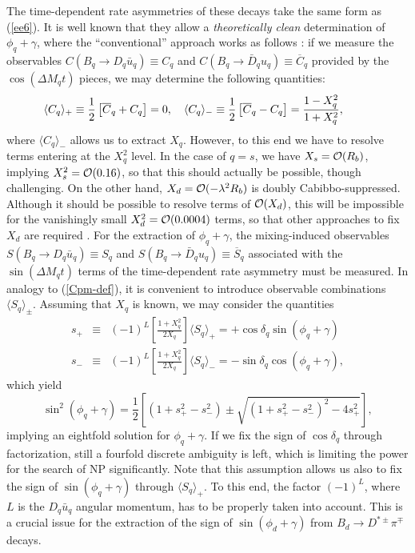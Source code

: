 \documentclass[11pt]{cernrep}
\begin{document}
The time-dependent rate asymmetries of these decays take the same form
as (\ref{ee6}).  It is well known that they allow a {\it theoretically 
clean} determination of $\phi_q+\gamma$, where the ``conventional'' 
approach works as follows \cite{BsDsK,BdDpi}: 
if we measure the observables 
$C(B_q\to D_q\bar u_q)\equiv C_q$ 
and $C(B_q\to \bar D_q u_q)\equiv \overline{C}_q$ provided by the
$\cos(\Delta M_qt)$ pieces, we may determine the following quantities:
\begin{equation}\label{Cpm-def}
\hspace*{-0.9truecm}
\langle C_q\rangle_+\equiv
\frac{1}{2}\left[\overline{C}_q+ C_q\right]=0, \quad
\langle C_q\rangle_-\equiv
\frac{1}{2}\left[\overline{C}_q-C_q\right]=\frac{1-X_q^2}{1+X_q^2},
\end{equation}
where $\langle C_q\rangle_-$ allows us to extract $X_q$. However, to this
end we have to resolve terms entering at the $X_q^2$ level. In the case 
of $q=s$, we have $X_s={\cal O}(R_b)$, implying $X_s^2={\cal O}(0.16)$, so 
that this should actually be possible, though challenging. On the other hand, 
$X_d={\cal O}(-\lambda^2R_b)$ is doubly Cabibbo-suppressed. Although it 
should be possible to resolve terms of ${\cal O}(X_d)$, this will be 
impossible for the vanishingly small $X_d^2={\cal O}(0.0004)$ 
terms, so that other approaches to fix $X_d$ are required
\cite{BdDpi}. For the extraction of $\phi_q+\gamma$, the 
mixing-induced observables $S(B_q\to D_q\bar u_q)\equiv S_q$ and 
$S(B_q\to \bar D_q u_q)\equiv \overline{S}_q$ associated with the
$\sin(\Delta M_qt)$ terms of the time-dependent rate asymmetry must be 
measured. In analogy to (\ref{Cpm-def}), it is convenient to
introduce observable combinations $\langle S_q\rangle_\pm$. Assuming 
that $X_q$ is known, we may consider the quantities
\begin{eqnarray}
s_+&\equiv& (-1)^L
\left[\frac{1+X_q^2}{2 X_q}\right]\langle S_q\rangle_+
=+\cos\delta_q\sin(\phi_q+\gamma)\\
s_-&\equiv&(-1)^L
\left[\frac{1+X_q^2}{2X_q}\right]\langle S_q\rangle_-
=-\sin\delta_q\cos(\phi_q+\gamma),
\end{eqnarray}
which yield
\begin{equation}\label{conv-extr}
\sin^2(\phi_q+\gamma)=\frac{1}{2}\left[(1+s_+^2-s_-^2) \pm
\sqrt{(1+s_+^2-s_-^2)^2-4s_+^2}\right],
\end{equation}
implying an eightfold solution for $\phi_q+\gamma$. If we fix the sign of
$\cos\delta_q$ through factorization,  still a fourfold discrete ambiguity is left,
which is limiting the power for the search of NP significantly.  
Note that this assumption allows us also 
to fix the sign of $\sin(\phi_q+\gamma)$ through $\langle S_q\rangle_+$. 
To this end, the factor $(-1)^L$, where $L$ is the $D_q\bar u_q$ 
angular momentum, has to be properly taken into account. 
This is a crucial issue for the extraction of 
the sign of $\sin(\phi_d+\gamma)$ from $B_d\to D^{\ast\pm}\pi^\mp$ decays.
\end{document}
